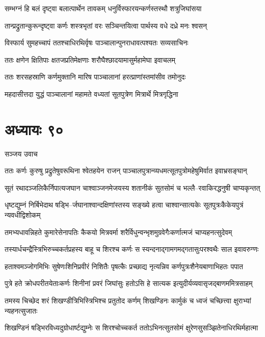\twolineshloka
{सम्भग्नं हि बलं दृष्ट्वा बलात्पार्थेन तावकम्}
{धनुर्विस्फारयन्कर्णस्तस्थौ शत्रुजिघांसया}


\twolineshloka
{तान्प्रद्रुतान्कुरून्दृष्ट्वा कर्णः शस्त्रभृतां वरः}
{सञ्चिन्तयित्वा पार्थस्य वधे दध्रे मनः श्वसन्}


\twolineshloka
{विस्फार्य सुमहच्चापं ततश्चाधिरथिर्वृषः}
{पाञ्चालान्पुनराधावत्पश्यतः सव्यसाचिनः}


\twolineshloka
{ततः क्षणेन क्षितिपाः क्षतजप्रतिमेक्षणाः}
{शरौघैश्छादयामासुर्महामेघा इवाचलम्}


\twolineshloka
{ततः शरसहस्राणि कर्णमुक्तानि मारिष}
{पाञ्चालानां हरत्प्राणांस्तमांसीव तमोनुदः}


\twolineshloka
{महदासीत्तदा युद्धं पाञ्चालानां महामते}
{वध्यतां सूतपुत्रेण मित्रार्थे मित्रगृद्धिना}


\chapter{अध्यायः ९०}
\twolineshloka
{सञ्जय उवाच}
{}


\twolineshloka
{ततः कर्णः कुरुषु प्रद्रुतेषुवरूथिना श्वेतहयेन राजन्}
{पाञ्चालपुत्रान्व्यधमत्सूतपुत्रोमहेषुमिर्वात इवाभ्रसङ्घान्}


\twolineshloka
{सूतं रथादञ्जलिकैर्निपात्यजघान चाश्वाञ्जनमेजयस्य}
{शतानीकं सुतसोमं च भल्लै--रवाकिरद्धनुषी चाप्यकृन्तत्}


\twolineshloka
{धृष्टद्युम्नं निर्बिभेदाथ षड्भि--र्जघानाश्वान्दक्षिणांस्तस्य सङ्ख्ये}
{हत्वा चाश्वान्सात्यकेः सूतपुत्रःकैकेयपुत्रं न्यवधीद्विशोकम्}


\twolineshloka
{तमभ्यधावन्निहते कुमारेसेनापतिः कैकयो मित्रवर्मा}
{शरैर्विधुन्वन्भृशमुग्रवेगैःकर्णात्मजं चाप्यहनत्सुदेवम्}


\twolineshloka
{तस्यार्धचन्द्रैस्त्रिभिरुच्चकर्तप्रहस्य बाहू च शिरश्च कर्णः}
{स स्यन्दनाद्गामगमद्गतासुःपरश्वथैः साल इवावरुग्णः}


\twolineshloka
{हताश्वमञ्जोगमिभिः सुषेणःशिनिप्रवीरं निशितैः पृषत्कैः}
{प्रच्छाद्य नृत्यन्निव कर्णपुत्रःशैनेयबाणाभिहतः पपात}


\twolineshloka
{पुत्रे हते क्रोधपरीतयेताःकर्णः शिनीनां प्रवरं जिघांसुः}
{हतोऽसि हे सात्यक इत्युदीर्यव्यवासृजद्बाणममित्रसाहम्}


\twolineshloka
{तमस्य चिच्छेद शरं शिखण्डीत्रिभिस्त्रिभिश्च प्रतुतोद कर्णम्}
{शिखण्डिनः कार्मुकं च ध्वजं चच्छित्त्वा क्षुराभ्यां न्यहनत्सुजातः}


\twolineshloka
{शिखण्डिनं षड्भिरविध्यदुग्रोधार्ष्टद्युम्नेः स शिरश्चोच्चकर्त}
{ततोऽभिनत्सुतसोमं क्षुरेणसुसञ्झितेनाधिरथिर्महात्मा}


